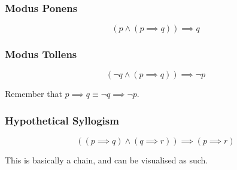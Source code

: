 \subsubsection{Modus Ponens}\label{ssub:modus_ponens}

\begin{minipage}{0.45\linewidth}
\end{minipage}
\hfill
\begin{minipage}{0.45\linewidth}
    \[
        (p \land (p \implies q)) \implies q
    \]
\end{minipage}

\subsubsection{Modus Tollens}\label{ssub:modus_tollens}

\begin{minipage}{0.45\linewidth}
\end{minipage}
\hfill
\begin{minipage}{0.45\linewidth}
    \[
        (\neg q \land (p \implies q)) \implies \neg p
    \]
\end{minipage}

\begin{note}
    Remember that \(p \implies q \equiv \neg q \implies \neg p\).
\end{note}

\subsubsection{Hypothetical Syllogism}\label{ssub:hypothetical_syllogism}

\begin{minipage}{0.45\linewidth}
\end{minipage}
\hfill
\begin{minipage}{0.45\linewidth}
    \[
        \left( (p \implies q) \land (q \implies r) \right) \implies (p \implies r)
    \]
\end{minipage}

\begin{note}
    This is basically a chain, and can be visualised as such.
\end{note}


